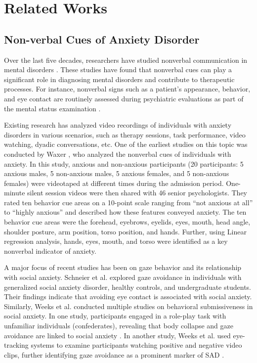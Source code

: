 \section{Related Works}
\label{section: RW}

\subsection{Non-verbal Cues of Anxiety Disorder}
Over the last five decades, researchers have studied nonverbal communication in mental disorders \cite{waxer1977nonverbal, argyle1978non, perez2003nonverbal,foley2010nonverbal, schneier2011fear, gilboa2013more, weeks2019fear, asher2020out, shatz2024nonverbal}. These studies have found that nonverbal cues can play a significant role in diagnosing mental disorders and contribute to therapeutic processes. For instance, nonverbal signs such as a patient’s appearance, behavior, and eye contact are routinely assessed during psychiatric evaluations as part of the mental status examination \cite{foley2010nonverbal}.

Existing research has analyzed video recordings of individuals with anxiety disorders in various scenarios, such as therapy sessions, task performance, video watching, dyadic conversations, etc. One of the earliest studies on this topic was conducted by Waxer \cite{waxer1977nonverbal}, who analyzed the nonverbal cues of individuals with anxiety. In this study, anxious and non-anxious participants (20 participants: 5 anxious males, 5 non-anxious males, 5 anxious females, and 5 non-anxious females) were videotaped at different times during the admission period. One-minute silent session videos were then shared with 46 senior psychologists. They rated ten behavior cue areas on a 10-point scale ranging from ``not anxious at all'' to ``highly anxious'' and described how these features conveyed anxiety. The ten behavior cue areas were the forehead, eyebrows, eyelids, eyes, mouth, head angle, shoulder posture, arm position, torso position, and hands. Further, using Linear regression analysis, hands, eyes, mouth, and torso were identified as a key nonverbal indicator of anxiety.

A major focus of recent studies has been on gaze behavior and its relationship with social anxiety. Schneier et al. \cite{schneier2011fear} explored gaze avoidance in individuals with generalized social anxiety disorder, healthy controls, and undergraduate students. Their findings indicate that avoiding eye contact is associated with social anxiety. Similarly, Weeks et al. \cite{weeks2011exploring, weeks2019fear} conducted multiple studies on behavioral submissiveness in social anxiety. In one study, participants engaged in a role-play task with unfamiliar individuals (confederates), revealing that body collapse and gaze avoidance are linked to social anxiety \cite{weeks2011exploring}. In another study, Weeks et al. used eye-tracking systems to examine participants watching positive and negative video clips, further identifying gaze avoidance as a prominent marker of SAD \cite{weeks2019fear}.

